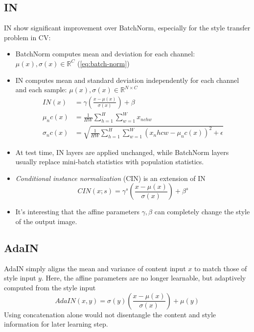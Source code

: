 \subsection{IN}
\ac{IN} \cite{ulyanov2016texture} show significant improvement over \ac{BatchNorm}, especially for the style transfer problem in \ac{CV}:
\begin{itemize}
	\item \ac{BatchNorm} computes mean and deviation for each channel: $\mu(x), \sigma(x) \in \mathbb{R}^C$ (\eqref{eq:batch-norm})
	\item \ac{IN} computes mean and standard deviation independently for each channel and each sample: $\mu(x), \sigma(x) \in \mathbb{R}^{N \times C}$
	\begin{align}
		IN(x) &= \gamma \left(\frac{x - \mu(x)}{\sigma(x)}\right) + \beta\\
		\mu_nc(x) &= \frac{1}{HW} \sum_{h=1}^{H} \sum_{w=1}^{W} x_{nchw}\\
		\sigma_nc(x) &= \sqrt{\frac{1}{HW} \sum_{h=1}^{H} \sum_{w=1}^{W} (x_nhcw - \mu_nc(x))^2 + \epsilon}
	\end{align}
	\item At test time, \ac{IN} layers are applied unchanged, while \ac{BatchNorm} layers usually replace mini-batch statistics with population statistics.
	\item \textit{Conditional instance normalization} (CIN) is an extension of \ac{IN} \cite{dumoulin2016learned}
	\begin{equation}
		CIN(x; s) = \gamma^s \left(\frac{x - \mu(x)}{\sigma(x)}\right) + \beta^s
	\end{equation}
	\item It's interesting that the affine parameters $\gamma, \beta$ can completely change the style of the output image.
\end{itemize}
\subsection{AdaIN}
\ac{AdaIN} simply aligns the mean and variance of content input $x$ to match those of style input $y$. Here, the affine parameters are no longer learnable, but adaptively computed from
the style input \cite{huang2017arbitrary}
\begin{equation}
	AdaIN(x,y) = \sigma(y) \left(\frac{x - \mu(x)}{\sigma(x)}\right) + \mu(y)
\end{equation}
\note Using concatenation alone would not disentangle the content and style information for later learning step.

